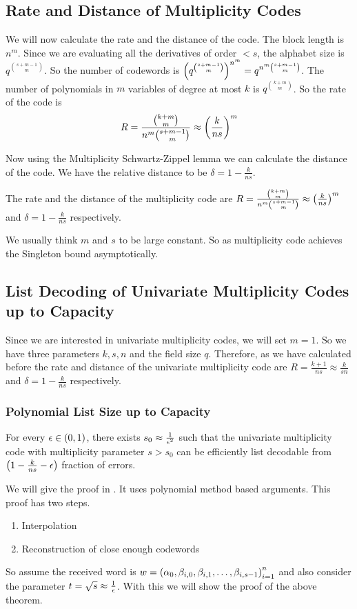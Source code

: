 \subsection{Rate and Distance of Multiplicity Codes}
We will now calculate the rate and the distance of the code. The block length is $n^m$. Since we are evaluating all the derivatives of order $<s$, the alphabet size is $q^{\binom{s+m-1}{m}}$. So the number of codewords is $\left(q^{\binom{s+m-1}{m}}\right)^{n^m}=q^{n^m\binom{s+m-1}{m}}$. The number of polynomials in $m$ variables of degree at most $k$ is $q^{\binom{k+m}{m}}$. So the rate of the code is $$R=\frac{\binom{k+m}{m}}{n^m\binom{s+m-1}{m}}\approx \left(\frac{k}{n s}\right)^m$$

Now using the Multiplicity Schwartz-Zippel lemma we can calculate the distance of the code. We have the relative distance to be $\delta=1-\frac{k}{ns}$. 

\begin{Theorem}{}{}
The rate and the distance of the multiplicity code are $R=\frac{\binom{k+m}{m}}{n^m\binom{s+m-1}{m}}\approx \left(\frac{k}{n s}\right)^m$ and $\delta=1-\frac{k}{ns}$ respectively.
\end{Theorem}
We usually think $m$ and $s$ to be large constant. So as multiplicity code achieves the Singleton bound asymptotically.
\newpage

\subsection{List Decoding of Univariate Multiplicity Codes up to Capacity}
Since we are interested in univariate multiplicity codes, we will set $m=1$. So we have three parameters $k,s,n$ and the field size $q$. Therefore, as we have calculated before the rate and distance of the univariate multiplicity code are $R=\frac{k+1}{ns}\approx \frac{k}{sn}$ and $\delta=1-\frac{k}{ns}$ respectively. 
\subsubsection{Polynomial List Size up to Capacity}
\begin{Theorem}{\cite{Kopparty_2015_,GuruswamiWang_2011}}{}
For every $\epsilon\in(0,1)$, there exists $s_0\approx \frac1{\epsilon^2}$ such that the univariate multiplicity code with multiplicity parameter $s>s_0$ can be efficiently list decodable from $\left(1-\frac{k}{ns}-\epsilon\right)$ fraction of errors.
\end{Theorem}We will give the proof in \cite{GuruswamiWang_2011}. It uses polynomial method based arguments. This proof has two steps.\begin{enumerate}[label=Step \arabic*:, leftmargin=*]
    \item Interpolation
    \item Reconstruction of close enough codewords
\end{enumerate}So assume the received word is $w=\left(\alpha_0,\beta_{i,0},\beta_{i,1},\dots, \beta_{i,s-1}\right)_{i=1}^n$ and also consider the parameter $t=\sqrt{s}\approx \frac1{\epsilon}$. With this we will show the proof of the above theorem. 

